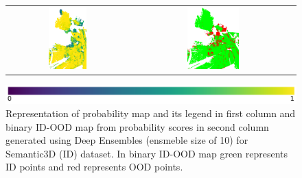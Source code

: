 \begin{figure}[h!]
\begin{tabular}{cc}
            \includegraphics[width=0.33\textwidth, height=0.18\textheight]{images/ood_imgs/de_sem3d/de_prob_10_3.pdf}& 
            \includegraphics[width=0.33\textwidth, height=0.18\textheight]{images/ood_imgs/de_sem3d/de_ood_auroc_3.pdf}\\
        \end{tabular}
        \includegraphics[scale=0.45]{images/prob_legend.pdf}
        \caption{Representation of probability map and its legend in first column and binary ID-OOD map from probability scores in second column generated using Deep Ensembles (ensmeble size of 10) for Semantic3D (ID) dataset. In binary ID-OOD map green represents ID points and red represents OOD points.}
        \label{fig:de_ood_auroc_sem3d_prob}
    \end{figure}
